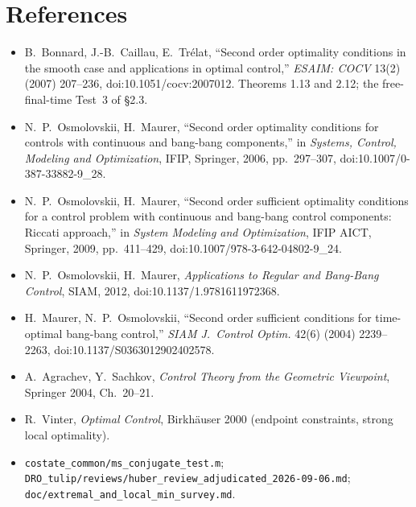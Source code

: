 \documentclass[11pt]{article}
\theoremstyle{definition}
\begin{document}
\section*{References}
\begin{itemize}
\item B.~Bonnard, J.-B.~Caillau, E.~Tr\'elat, ``Second order optimality
conditions in the smooth case and applications in optimal control,''
\emph{ESAIM: COCV} 13(2) (2007) 207--236, doi:10.1051/cocv:2007012. Theorems 1.13 and 2.12;
the free-final-time Test~3 of \S2.3.
\item N.~P.~Osmolovskii, H.~Maurer, ``Second order optimality conditions for
controls with continuous and bang-bang components,'' in \emph{Systems, Control,
Modeling and Optimization}, IFIP, Springer, 2006, pp.~297--307,
doi:10.1007/0-387-33882-9\_28.
\item N.~P.~Osmolovskii, H.~Maurer, ``Second order sufficient optimality
conditions for a control problem with continuous and bang-bang control
components: Riccati approach,'' in \emph{System Modeling and Optimization}, IFIP
AICT, Springer, 2009, pp.~411--429, doi:10.1007/978-3-642-04802-9\_24.
\item N.~P.~Osmolovskii, H.~Maurer, \emph{Applications to Regular and Bang-Bang
Control}, SIAM, 2012, doi:10.1137/1.9781611972368.
\item H.~Maurer, N.~P.~Osmolovskii, ``Second order sufficient conditions for
time-optimal bang-bang control,'' \emph{SIAM J.\ Control Optim.} 42(6) (2004)
2239--2263, doi:10.1137/S0363012902402578.
\item A.~Agrachev, Y.~Sachkov, \emph{Control Theory from the Geometric
Viewpoint}, Springer 2004, Ch.~20--21.
\item R.~Vinter, \emph{Optimal Control}, Birkh\"auser 2000 (endpoint
constraints, strong local optimality).
\item \texttt{costate\_common/ms\_conjugate\_test.m}; \texttt{DRO\_tulip/reviews/huber\_review\_adjudicated\_2026-09-06.md};
\texttt{doc/extremal\_and\_local\_min\_survey.md}.
\end{itemize}
\end{document}
